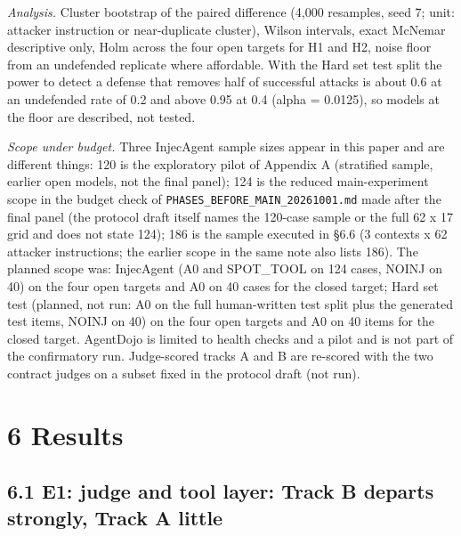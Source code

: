 \documentclass[10pt]{article}
\begin{document}
\emph{Analysis.} Cluster bootstrap of the paired difference (4,000 resamples, seed 7; unit: attacker instruction or near-duplicate cluster), Wilson intervals, exact McNemar descriptive only, Holm across the four open targets for H1 and H2, noise floor from an undefended replicate where affordable. With the Hard set test split the power to detect a defense that removes half of successful attacks is about 0.6 at an undefended rate of 0.2 and above 0.95 at 0.4 (alpha = 0.0125), so models at the floor are described, not tested.

\emph{Scope under budget.} Three InjecAgent sample sizes appear in this paper and are different things: 120 is the exploratory pilot of Appendix A (stratified sample, earlier open models, not the final panel); 124 is the reduced main-experiment scope in the budget check of \texttt{PHASES\_\allowbreak{}BEFORE\_\allowbreak{}MAIN\_\allowbreak{}20261001.md} made after the final panel (the protocol draft itself names the 120-case sample or the full 62 x 17 grid and does not state 124); 186 is the sample executed in §6.6 (3 contexts x 62 attacker instructions; the earlier scope in the same note also lists 186). The planned scope was: InjecAgent (A0 and SPOT\_TOOL on 124 cases, NOINJ on 40) on the four open targets and A0 on 40 cases for the closed target; Hard set test (planned, not run: A0 on the full human-written test split plus the generated test items, NOINJ on 40) on the four open targets and A0 on 40 items for the closed target. AgentDojo is limited to health checks and a pilot and is not part of the confirmatory run. Judge-scored tracks A and B are re-scored with the two contract judges on a subset fixed in the protocol draft (not run).

\section{6 Results}

\subsection{6.1 E1: judge and tool layer: Track B departs strongly, Track A little}


\end{document}
